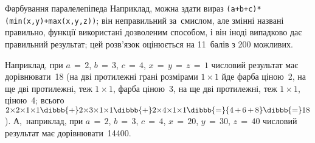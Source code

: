 {\begin{problemAllDefault}{Фарбування паралелепіпеда}
Наприклад, можна здати вираз \texttt{(a+b+c)*(min(x,y)+max(x,y,z))}; він непра\-виль\-ний за~смислом, але змінні названі правильно, функції використані дозволеним способом, і він іноді випадково дає правильний результат; цей розв'язок оцінюється на 11~балів з 200 можливих.

Наприклад, при 
${a\,{=}\,2}$, 
${b\,{=}\,3}$, 
${c\,{=}\,4}$, 
${x\,{=}\,y\,{=}\,z\,{=}\,1}$ 
числовий результат має дорівнювати~18 (на дві протилежні грані розмірами $1{\times}1$ йде фарба ціною~2, на ще дві протилежні, теж $1{\times}1$, фарба ціною~3, на ще дві протилежні, теж $1{\times}1$, ціною~4; всього 
$2{\times}2{\times}1{\times}1\dibbb{{+}}
2{\times}3{\times}1{\times}1\dibbb{{+}}
2{\times}4{\times}1{\times}1\dibbb{{=}}
{4\,{+}\,6\,{+}\,8}\dibbb{{=}}18$).
А,~наприклад, при 
${a\,{=}\,2}$, 
${b\,{=}\,3}$, 
${c\,{=}\,4}$, 
${x\,{=}\,20}$, 
${y\,{=}\,30}$, 
${z\,{=}\,40}$ 
числовий результат має дорівнювати~14400.

\end{problemAllDefault}

}